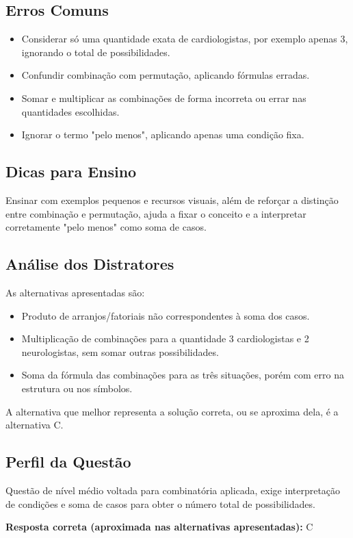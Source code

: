 \documentclass{article}
\begin{document}
\subsection*{Erros Comuns}
\begin{itemize}
  \item Considerar só uma quantidade exata de cardiologistas, por exemplo apenas 3, ignorando o total de possibilidades.
  \item Confundir combinação com permutação, aplicando fórmulas erradas.
  \item Somar e multiplicar as combinações de forma incorreta ou errar nas quantidades escolhidas.
  \item Ignorar o termo "pelo menos", aplicando apenas uma condição fixa.
\end{itemize}

\subsection*{Dicas para Ensino}
Ensinar com exemplos pequenos e recursos visuais, além de reforçar a distinção entre combinação e permutação, ajuda a fixar o conceito e a interpretar corretamente "pelo menos" como soma de casos.

\subsection*{Análise dos Distratores}
As alternativas apresentadas são:

\begin{itemize}
  \item[A)] Produto de arranjos/fatoriais não correspondentes à soma dos casos.
  \item[B)] Multiplicação de combinações para a quantidade 3 cardiologistas e 2 neurologistas, sem somar outras possibilidades.
  \item[C)] Soma da fórmula das combinações para as três situações, porém com erro na estrutura ou nos símbolos.
\end{itemize}

A alternativa que melhor representa a solução correta, ou se aproxima dela, é a alternativa C.

\subsection*{Perfil da Questão}
Questão de nível médio voltada para combinatória aplicada, exige interpretação de condições e soma de casos para obter o número total de possibilidades.

\vspace{1em}

\textbf{Resposta correta (aproximada nas alternativas apresentadas):} C
\end{document}
